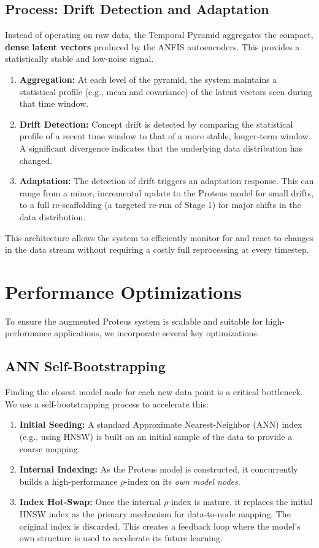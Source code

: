 \documentclass{article}
\begin{document}
\subsection{Process: Drift Detection and Adaptation}
Instead of operating on raw data, the Temporal Pyramid aggregates the compact, \textbf{dense latent vectors} produced by the ANFIS autoencoders. This provides a statistically stable and low-noise signal.
\begin{enumerate}
    \item \textbf{Aggregation:} At each level of the pyramid, the system maintains a statistical profile (e.g., mean and covariance) of the latent vectors seen during that time window.
    \item \textbf{Drift Detection:} Concept drift is detected by comparing the statistical profile of a recent time window to that of a more stable, longer-term window. A significant divergence indicates that the underlying data distribution has changed.
    \item \textbf{Adaptation:} The detection of drift triggers an adaptation response. This can range from a minor, incremental update to the Proteus model for small drifts, to a full re-scaffolding (a targeted re-run of Stage 1) for major shifts in the data distribution.
\end{enumerate}
This architecture allows the system to efficiently monitor for and react to changes in the data stream without requiring a costly full reprocessing at every timestep.

\section{Performance Optimizations}

To ensure the augmented Proteus system is scalable and suitable for high-performance applications, we incorporate several key optimizations.

\subsection{ANN Self-Bootstrapping}
Finding the closest model node for each new data point is a critical bottleneck. We use a self-bootstrapping process to accelerate this:
\begin{enumerate}
    \item \textbf{Initial Seeding:} A standard Approximate Nearest-Neighbor (ANN) index (e.g., using HNSW) is built on an initial sample of the data to provide a coarse mapping.
    \item \textbf{Internal Indexing:} As the Proteus model is constructed, it concurrently builds a high-performance $\rho$-index on its \textit{own model nodes}.
    \item \textbf{Index Hot-Swap:} Once the internal $\rho$-index is mature, it replaces the initial HNSW index as the primary mechanism for data-to-node mapping. The original index is discarded. This creates a feedback loop where the model's own structure is used to accelerate its future learning.
\end{enumerate}
\end{document}
